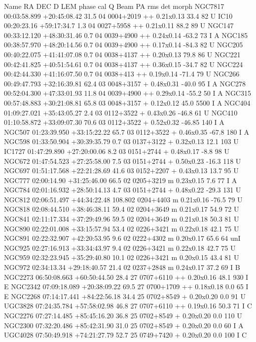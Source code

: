 Name RA DEC D LEM phase cal Q Beam PA rms det morph 
NGC7817 00:03:58.899 +20:45:08.42 31.5 04 0004+2019 ++ 0.21x0.13 33.4 82 U 
IC10 00:20:23.16 +59:17:34.7 1.3 04 0027+5958 ++ 0.21x0.11 88.2 89 U 
NGC147 00:33:12.120 +48:30:31.46 0.7 04 0039+4900 ++ 0.24x0.14 -63.2 73 I A 
NGC185 00:38:57.970 +48:20:14.56 0.7 04 0039+4900 ++ 0.17x0.14 -84.3 82 U 
NGC205 00:40:22.075 +41:41:07.08 0.7 04 0038+4137 ++ 0.20x0.13 79.8 86 U 
NGC221 00:42:41.825 +40:51:54.61 0.7 04 0038+4137 ++ 0.36x0.15 -34.7 82 U 
NGC224 00:42:44.330 +41:16:07.50 0.7 04 0038+413 ++ 0.19x0.14 -71.4 79 U 
NGC266 00:49:47.793 +32:16:39.81 62.4 03 0048+3157 + 0.48x0.31 -40.0 95 I A 
NGC278 00:52:04.300 +47:33:01.93 11.8 04 0039+4900 ++ 0.29x0.14 -55.2 50 I A 
NGC315 00:57:48.883 +30:21:08.81 65.8 03 0048+3157 + 0.12x0.12 45.0 5500 I A 
NGC404 01:09:27.021 +35:43:05.27 2.4 03 0112+3522 + 0.43x0.26 -46.8 61 U 
NGC410 01:10:58.872 +33:09:07.30 70.6 03 0112+3522 + 0.52x0.32 -46.85 140 I A 
NGC507 01:23:39.950 +33:15:22.22 65.7 03 0112+3522 + 0.46x0.35 -67.8 180 I A 
NGC598 01:33:50.904 +30:39:35.79 0.7 03 0137+3122 + 0.32x0.13 12.1 103 U 
IC1727 01:47:29.890 +27:20:00.06 8.2 03 0151+2744 + 0.48x0.17 -8.8 98 U 
NGC672 01:47:54.523 +27:25:58.00 7.5 03 0151+2744 + 0.50x0.23 -16.3 118 U 
NGC697 01:51:17.568 +22:21:28.69 41.6 03 0152+2207 + 0.43x0.13 13.7 95 U 
NGC777 02:00:14.90 +31:25:46.00 66.5 02 0205+3219 m 0.23x0.15 7.6 77 I A 
NGC784 02:01:16.932 +28:50:14.13 4.7 03 0151+2744 + 0.48x0.22 -29.3 131 U 
NGC812 02:06:51.497 +44:34:22.48 108.802 0204+4403 m 0.21x0.16 -76.5 79 U 
NGC818 02:08:44.510 +38:46:38.11 59.4 02 0204+3649 m 0.21x0.17 54.9 72 U 
NGC841 02:11:17.334 +37:29:49.96 59.5 02 0204+3649 m 0.21x0.18 50.3 81 U 
NGC890 02:22:01.008 +33:15:57.94 53.4 02 0226+3421 m 0.22x0.18 42.1 75 U 
NGC891 02:22:32.907 +42:20:53.95 9.6 02 0222+4302 m 0.20x0.17 65.6 64 unI 
NGC925 02:27:16.913 +33:34:43.97 9.4 02 0226+3421 m 0.22x0.18 42.7 75 U 
NGC959 02:32:23.945 +35:29:40.80 10.1 02 0226+3421 m 0.20x0.15 43.4 81 U 
NGC972 02:34:13.34 +29:18:40.57 21.4 02 0237+2848 m 0.24x0.17 37.2 69 I B 
NGC2273 06:50:08.663 +60:50:44.50 28.4 27 0707+6110 ++ 0.20x0.16 48.1 930 I E 
NGC2342 07:09:18.089 +20:38:09.22 69.5 27 0700+1709 ++ 0.18x0.18 0.0 65 I E 
NGC2268 07:14:17.441 +84:22:56.18 34.4 25 0702+8549 + 0.20x0.20 0.0 91 U 
UGC3828 07:24:35.784 +57:58:02.98 46.8 27 0707+6110 ++ 0.19x0.16 50.3 71 I C 
NGC2276 07:27:14.485 +85:45:16.20 36.8 25 0702+8549 + 0.20x0.20 0.0 110 U 
NGC2300 07:32:20.486 +85:42:31.90 31.0 25 0702+8549 + 0.20x0.20 0.0 60 I A 
UGC4028 07:50:49.918 +74:21:27.79 52.7 25 0749+7420 + 0.20x0.20 0.0 100 I C 

